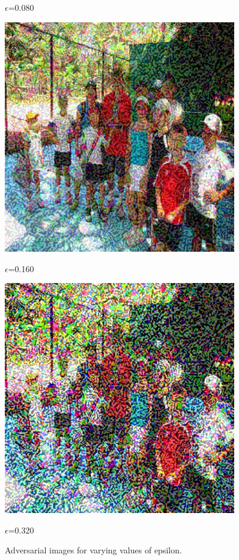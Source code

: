 \begin{figure}[h]
\begin{minipage}{0.12\textwidth}
        \caption*{$\epsilon$=0.080}
    \end{minipage}\hfill
    \begin{minipage}{0.12\textwidth}
        \centering
        \includegraphics[width=0.9\textwidth]{figures/group_of_people/group_of_people_0.160.png}
        \caption*{$\epsilon$=0.160}
    \end{minipage}\hfill
    \begin{minipage}{0.12\textwidth}
        \centering
        \includegraphics[width=0.9\textwidth]{figures/group_of_people/group_of_people_0.320.png}
        \caption*{$\epsilon$=0.320}
    \end{minipage}\hfill
    \caption{Adversarial images for varying values of epsilon.}
    \label{epsilon_on_images}
\end{figure}

